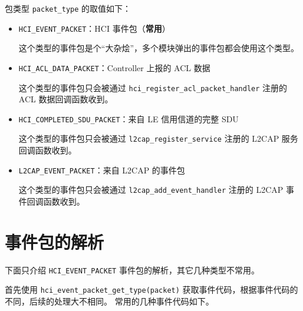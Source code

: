 \documentclass[
  12pt,
]{book}
\begin{document}
包类型 \texttt{packet\_type} 的取值如下：

\begin{itemize}
\item
  \texttt{HCI\_EVENT\_PACKET}：HCI 事件包（\textbf{常用}）

  这个类型的事件包是个``大杂烩''，多个模块弹出的事件包都会使用这个类型。
\item
  \texttt{HCI\_ACL\_DATA\_PACKET}：Controller 上报的 ACL 数据

  这个类型的事件包只会被通过 \texttt{hci\_register\_acl\_packet\_handler} 注册的 ACL 数据回调函数收到。
\item
  \texttt{HCI\_COMPLETED\_SDU\_PACKET}：来自 LE 信用信道的完整 SDU

  这个类型的事件包只会被通过 \texttt{l2cap\_register\_service} 注册的 L2CAP 服务回调函数收到。
\item
  \texttt{L2CAP\_EVENT\_PACKET}：来自 L2CAP 的事件包

  这个类型的事件包只会被通过 \texttt{l2cap\_add\_event\_handler} 注册的 L2CAP 事件回调函数收到。
\end{itemize}

\hypertarget{ux4e8bux4ef6ux5305ux7684ux89e3ux6790}{%
\section{事件包的解析}\label{ux4e8bux4ef6ux5305ux7684ux89e3ux6790}}

下面只介绍 \texttt{HCI\_EVENT\_PACKET} 事件包的解析，其它几种类型不常用。

首先使用 \texttt{hci\_event\_packet\_get\_type(packet)} 获取事件代码，根据事件代码的不同，后续的处理大不相同。
常用的几种事件代码如下。
\end{document}
